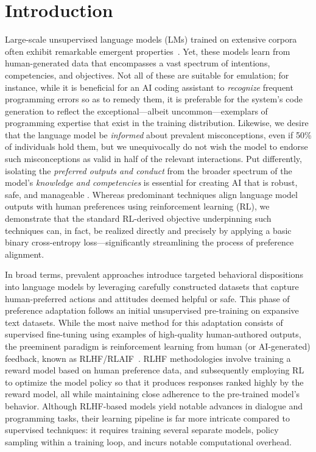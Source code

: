 \section{Introduction}
Large-scale unsupervised language models (LMs) trained on extensive corpora often exhibit remarkable emergent properties~\citep{chowdhery2022palm, brown2020language, touvron2023llama, bubeck2023sparks}. Yet, these models learn from human-generated data that encompasses a vast spectrum of intentions, competencies, and objectives. Not all of these are suitable for emulation; for instance, while it is beneficial for an AI coding assistant to \textit{recognize} frequent programming errors so as to remedy them, it is preferable for the system’s code generation to reflect the exceptional—albeit uncommon—exemplars of programming expertise that exist in the training distribution. Likewise, we desire that the language model be \textit{informed} about prevalent misconceptions, even if 50\% of individuals hold them, but we unequivocally do not wish the model to endorse such misconceptions as valid in half of the relevant interactions. Put differently, isolating the \emph{preferred outputs and conduct} from the broader spectrum of the model’s \textit{knowledge and competencies} is essential for creating AI that is robust, safe, and manageable \citep{ouyang2022training}. Whereas predominant techniques align language model outputs with human preferences using reinforcement learning (RL), we demonstrate that the standard RL-derived objective underpinning such techniques can, in fact, be realized directly and precisely by applying a basic binary cross-entropy loss—significantly streamlining the process of preference alignment.

In broad terms, prevalent approaches introduce targeted behavioral dispositions into language models by leveraging carefully constructed datasets that capture human-preferred actions and attitudes deemed helpful or safe. This phase of preference adaptation follows an initial unsupervised pre-training on expansive text datasets. While the most naive method for this adaptation consists of supervised fine-tuning using examples of high-quality human-authored outputs, the preeminent paradigm is reinforcement learning from human (or AI-generated) feedback, known as RLHF/RLAIF~\citep{christiano2017deep,bai2022constitutional}. RLHF methodologies involve training a reward model based on human preference data, and subsequently employing RL to optimize the model policy so that it produces responses ranked highly by the reward model, all while maintaining close adherence to the pre-trained model’s behavior. Although RLHF-based models yield notable advances in dialogue and programming tasks, their learning pipeline is far more intricate compared to supervised techniques: it requires training several separate models, policy sampling within a training loop, and incurs notable computational overhead.


